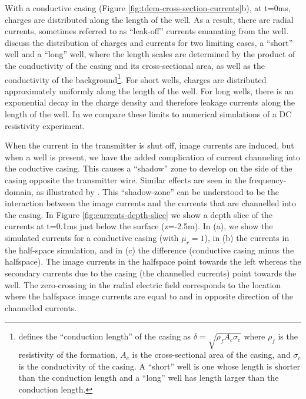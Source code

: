 \documentclass[onecolumn, extra, mreferee]{gji}
\begin{document}
With a conductive casing (Figure \ref{fig:tdem-cross-section-currents}b), at t=0ms, charges are distributed along the length of the well. As a result, there are radial currents, sometimes referred to as ``leak-off'' currents emanating from the well. \cite{kaufman_transmission-line_1993} discuss the distribution of charges and currents for two limiting cases, a ``short'' well and a ``long'' well, where the length scales are determined by the product of the conductivity of the casing and its cross-sectional area, as well as the conductivity of the background\footnote{\cite{schenkel_electrical_1994} defines the ``conduction length'' of the casing as $\delta = \sqrt{\rho_f A_c \sigma_c}$ where $\rho_f$ is the resistivity of the formation, $A_c$ is the cross-sectional area of the casing, and $\sigma_c$ is the conductivity of the casing. A ``short'' well is one whose length is shorter than the conduction length and a ``long'' well has length larger than the conduction length. }. For short wells, charges are distributed approximately uniformly along the length of the well. For long wells, there is an exponential decay in the charge density and therefore leakage currents along the length of the well. In \cite{heagy_modeling_2019} we compare these limits to numerical simulations of a DC resistivity experiment.

When the current in the transmitter is shut off, image currents are induced, but when a well is present, we have the added complication of current channeling into the coductive casing. This causes a ``shadow'' zone to develop on the side of the casing opposite the transmitter wire. Similar effects are seen in the frequency-domain, as illustrated by \cite{wilt_casing_2020}. This ``shadow-zone'' can be understood to be the interaction between the image currents and the currents that are channelled into the casing. In Figure \ref{fig:currents-depth-slice} we show a depth slice of the currents at t=0.1ms just below the surface (z=-2.5m). In (a), we show the simulated currents for a conductive casing (with $\mu_r = 1$), in (b) the currents in the half-space simulation, and in (c) the difference (conductive casing minus the halfspace). The image currents in the halfspace point towards the left whereas the secondary currents due to the casing (the channelled currents) point towards the well. The zero-crossing in the radial electric field corresponds to the location where the halfspace image currents are equal to and in opposite direction of the channelled currents.



\end{document}
